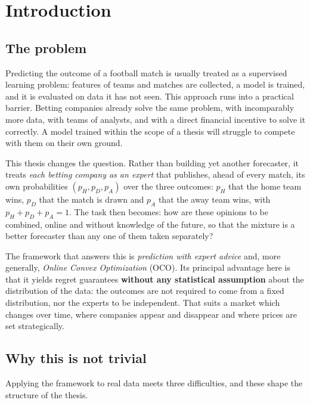\documentclass[12pt,a4paper,oneside]{report}
\renewcommand{\_}{\oldunderscore\allowbreak}
\theoremstyle{definition}
\theoremstyle{plain}
\theoremstyle{definition}   %
\begin{document}
\tableofcontents
\cleardoublepage

\chapter{Introduction}

\section{The problem}

Predicting the outcome of a football match is usually treated as a supervised learning
problem: features of teams and matches are collected, a model is trained, and it is evaluated
on data it has not seen. This approach runs into a practical barrier. Betting companies
already solve the same problem, with incomparably more data, with teams of analysts, and with
a direct financial incentive to solve it correctly. A model trained within the scope of a
thesis will struggle to compete with them on their own ground.

This thesis changes the question. Rather than building yet another forecaster, it treats
\emph{each betting company as an expert} that publishes, ahead of every match, its own
probabilities $(p_H, p_D, p_A)$ over the three outcomes: $p_H$ that the home team wins, $p_D$
that the match is drawn and $p_A$ that the away team wins, with $p_H + p_D + p_A = 1$. The task
then becomes: how are these
opinions to be combined, online and without knowledge of the future, so that the mixture is a
better forecaster than any one of them taken separately?

The framework that answers this is \emph{prediction with expert advice} and, more generally,
\emph{Online Convex Optimization} (OCO). Its principal advantage here is that it yields regret
guarantees \textbf{without any statistical assumption} about the distribution of the data: the
outcomes are not required to come from a fixed distribution, nor the experts to be
independent. That suits a market which changes over time, where companies appear and
disappear and where prices are set strategically.

\section{Why this is not trivial}

Applying the framework to real data meets three difficulties, and these shape the structure of
the thesis.
\end{document}
